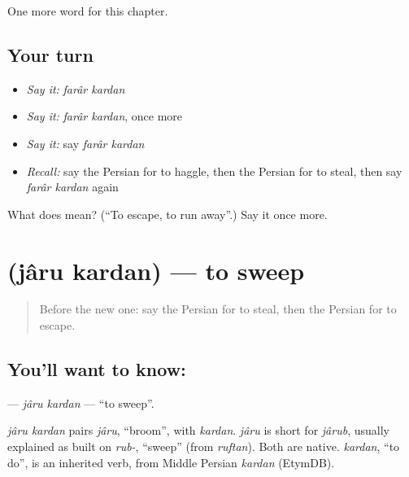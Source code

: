 \begin{grammarlens}[title={What you've built}]
One more word for this chapter.
\end{grammarlens}

\subsection*{Your turn}
\begin{itemize}
\raggedright
  \item \emph{Say it:} \emph{farâr kardan}
  \item \emph{Say it:} \emph{farâr kardan}, once more
  \item \emph{Say it:} say \emph{farâr kardan}
  \item \emph{Recall:} say the Persian for to haggle, then the Persian for to steal, then say \emph{farâr kardan} again
\end{itemize}

\begin{tcolorbox}[breakable,colback=teal!4,colframe=teal!35!black,title={Before you move on}]
What does   mean? (\textquotedblleft{}To escape, to run away\textquotedblright{}.) Say it once more.
\end{tcolorbox}
\section[\texorpdfstring{\fa{جارو} \fa{کردن} (jâru kardan)}{جارو کردن (jâru kardan)}]{  (jâru kardan) — to sweep}

\label{lesson:FA-C259-jaru-kardan}



\begin{quote}
Before the new one: say the Persian for to steal, then the Persian for to escape.
\end{quote}

\subsection*{You'll want to know:  }
\textbf{ } — \emph{jâru kardan} — \textquotedblleft{}to sweep\textquotedblright{}.

\begin{cousinweb}
\emph{jâru kardan} pairs \emph{jâru}, \textquotedblleft{}broom\textquotedblright{}, with \emph{kardan}. \emph{jâru} is short for \emph{jârub}, usually explained as built on \emph{rub-}, \textquotedblleft{}sweep\textquotedblright{} (from \emph{ruftan}). Both are native. \emph{kardan}, \textquotedblleft{}to do\textquotedblright{}, is an inherited verb, from Middle Persian \emph{kardan} (EtymDB).
\end{cousinweb}

